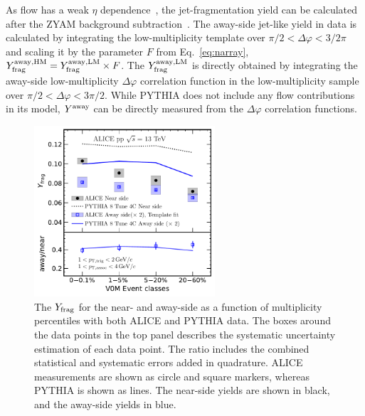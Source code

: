 As flow has a weak $\eta$ dependence~\cite{ATLAS:2011ah,PHENIX:2018hho,ALICE:2016tlx}, the jet-fragmentation yield can be calculated after the ZYAM background subtraction~\cite{Ajitanand:2005jj}. 
The away-side jet-like yield in data is calculated by integrating the low-multiplicity template over $\pi/2<\Delta\varphi<3/2\pi$ and scaling it by the parameter $F$ from Eq.~\ref{eq:narray}, $Y^{\rm{away, HM}}_{\mathrm{frag}} = Y^{\rm{away, LM}}_{\mathrm{frag}} \times F$. The $Y^{\rm{away, LM}}_{\mathrm{frag}}$ is directly obtained by integrating the away-side low-multiplicity $\Delta\varphi$ correlation function in the low-multiplicity sample over $\pi/2 < \Delta\varphi < 3\pi/2$.
While PYTHIA does not include any flow contributions in its model, $Y^{\rm{away}}$ can be directly measured from the $\Delta\varphi$ correlation functions.

\begin{figure}[h!]
	\centering
	\hspace{-3em}\includegraphics[width=0.6\textwidth]{figures/FIG3_Plot_v2Mult.pdf} 
	\caption{The $Y_{\rm{frag}}$ for the near- and away-side as a function of multiplicity percentiles with both ALICE and PYTHIA data. The boxes around the data points in the top panel describes the systematic uncertainty estimation of each data point. The ratio includes the combined statistical and systematic errors added in quadrature. ALICE measurements are shown as circle and square markers, whereas PYTHIA is shown as lines. The near-side yields are shown in black, and the away-side yields in blue.}
	\label{fig:Ymult}
\end{figure}

